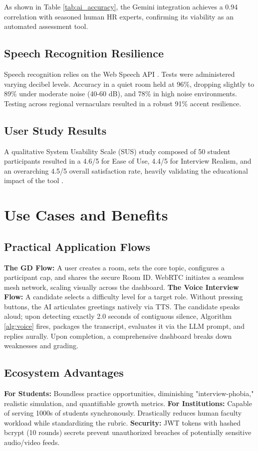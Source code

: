 \documentclass[conference]{IEEEtran}
\begin{document}
As shown in Table \ref{tab:ai_accuracy}, the Gemini integration achieves a 0.94 correlation with seasoned human HR experts, confirming its viability as an automated assessment tool.

\subsection{Speech Recognition Resilience}
Speech recognition relies on the Web Speech API \cite{b9}. Tests were administered varying decibel levels. Accuracy in a quiet room held at 96\%, dropping slightly to 89\% under moderate noise (40-60 dB), and 78\% in high noise environments. Testing across regional vernaculars resulted in a robust 91\% accent resilience.

\subsection{User Study Results}
A qualitative System Usability Scale (SUS) study composed of 50 student participants resulted in a 4.6/5 for Ease of Use, 4.4/5 for Interview Realism, and an overarching 4.5/5 overall satisfaction rate, heavily validating the educational impact of the tool \cite{b15}.

\section{Use Cases and Benefits}

\subsection{Practical Application Flows}
\textbf{The GD Flow:} A user creates a room, sets the core topic, configures a participant cap, and shares the secure Room ID. WebRTC initiates a seamless mesh network, scaling visually across the dashboard.
\textbf{The Voice Interview Flow:} A candidate selects a difficulty level for a target role. Without pressing buttons, the AI articulates greetings natively via TTS. The candidate speaks aloud; upon detecting exactly 2.0 seconds of contiguous silence, Algorithm \ref{alg:voice} fires, packages the transcript, evaluates it via the LLM prompt, and replies aurally. Upon completion, a comprehensive dashboard breaks down weaknesses and grading.

\subsection{Ecosystem Advantages}
\textbf{For Students:} Boundless practice opportunities, diminishing "interview-phobia," realistic simulation, and quantifiable growth metrics.
\textbf{For Institutions:} Capable of serving 1000s of students synchronously. Drastically reduces human faculty workload while standardizing the rubric.
\textbf{Security:} JWT tokens with hashed bcrypt (10 rounds) secrets prevent unauthorized breaches of potentially sensitive audio/video feeds.
\end{document}

